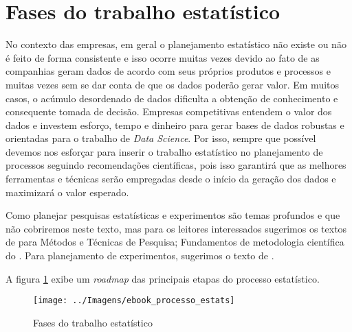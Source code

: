 \documentclass[11pt,]{style/krantz}
\theoremstyle{definition}
\theoremstyle{definition}
\theoremstyle{definition}
\theoremstyle{remark}
\begin{document}
\hypertarget{fases-do-trabalho-estatistico}{%
\section{Fases do trabalho estatístico}\label{fases-do-trabalho-estatistico}}

No contexto das empresas, em geral o planejamento estatístico não existe ou não é feito de forma consistente e isso ocorre muitas vezes devido ao fato de as companhias geram dados de acordo com seus próprios produtos e processos e muitas vezes sem se dar conta de que os dados poderão gerar valor. Em muitos casos, o acúmulo desordenado de dados dificulta a obtenção de conhecimento e consequente tomada de decisão. Empresas competitivas entendem o valor dos dados e investem esforço, tempo e dinheiro para gerar bases de dados robustas e orientadas para o trabalho de \emph{Data Science}. Por isso, sempre que possível devemos nos esforçar para inserir o trabalho estatístico no planejamento de processos seguindo recomendações científicas, pois isso garantirá que as melhores ferramentas e técnicas serão empregadas desde o início da geração dos dados e maximizará o valor esperado.

Como planejar pesquisas estatísticas e experimentos são temas profundos e que não cobriremos neste texto, mas para os leitores interessados sugerimos os textos de \citep{gil2008metodos} para Métodos e Técnicas de Pesquisa; Fundamentos de metodologia científica do \citep{koche2016fundamentos}. Para planejamento de experimentos, sugerimos o texto de \citep{montgomery2017design}.

A figura \ref{fig:fig00} exibe um \emph{roadmap} das principais etapas do processo estatístico.

\begin{figure}[H]

{\centering \texttt{[image: ../Imagens/ebook\_processo\_estats]} 

}

\caption{Fases do trabalho estatístico}\label{fig:fig00}
\end{figure}
\end{document}
